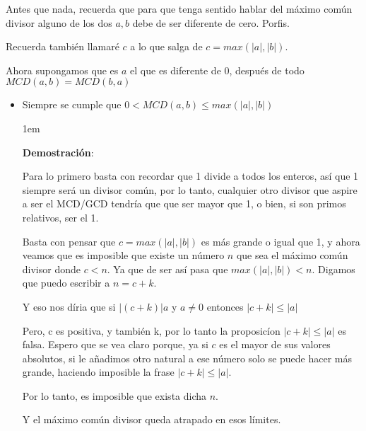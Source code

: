 \documentclass[12pt]{report}                                    %
\newenvironment{SmallIndentation}[1][0.75em]                    %
    {\begin{adjustwidth}{#1}{}\begin{footnotesize}}                 %
    {\end{footnotesize}\end{adjustwidth}}                           %
\begin{document}
            Antes que nada, recuerda que para que tenga sentido hablar del máximo común divisor
            alguno de los dos $a,b$ debe de ser diferente de cero. Porfis.

            Recuerda también llamaré $c$ a lo que salga de $c=max(|a|,|b|)$.

            Ahora supongamos que es $a$ el que es diferente de 0, después de todo
            $MCD(a,b) = MCD(b,a)$

            \begin{itemize}

                \item Siempre se cumple que $0 < MCD(a,b) \leq max(|a|,|b|)$

                    \begin{SmallIndentation}[1em]
                        \textbf{Demostración}:

                        Para lo primero basta con recordar que 1 divide a todos los enteros,
                        así que 1 siempre será un divisor común, por lo tanto, cualquier otro
                        divisor que aspire a ser el MCD/GCD tendría que que ser mayor que 1,
                        o bien, si son primos relativos, ser el 1.

                        Basta con pensar que $c=max(|a|,|b|)$ es más grande o igual que 1,
                        y ahora veamos que es imposible que existe un número $n$ que sea el
                        máximo común divisor donde $c < n$. Ya que de ser así pasa que
                        $max(|a|,|b|) < n$. Digamos que puedo escribir a $n=c+k$.

                        Y eso nos díria que si $|(c+k)|a$ y $a \neq 0$ entonces $|c+k| \leq |a|$

                        Pero, c es positiva, y también k, por lo tanto la proposicíon $|c+k| \leq |a|$
                        es falsa. Espero que se vea claro porque, ya si $c$ es el mayor de sus
                        valores absolutos, si le añadimos otro natural a ese número solo se puede hacer más
                        grande, haciendo imposible la frase $|c+k| \leq |a|$.

                        Por lo tanto, es imposible que exista dicha $n$.

                        Y el máximo común divisor queda atrapado en esos límites.

                    \end{SmallIndentation}



\end{itemize}
\end{document}
